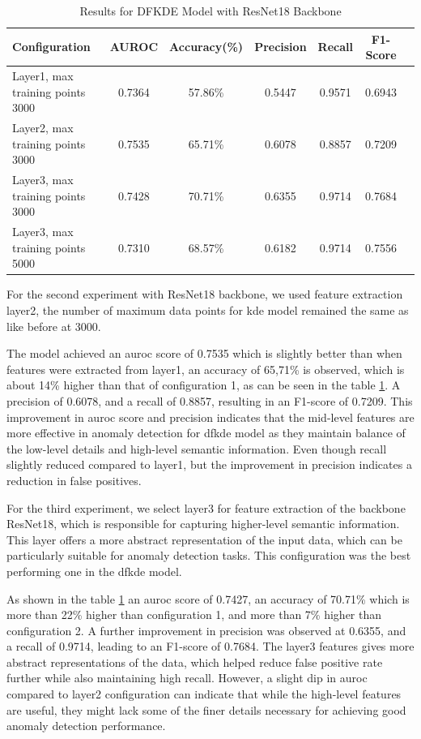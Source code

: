 \begin{table}[ht!]
    \centering
    \begin{tabular}{|l|c|c|c|c|c|c|}
        \hline
        \textbf{Configuration} & \textbf{AUROC} & \textbf{Accuracy(\%)} & \textbf{Precision} & \textbf{Recall} & \textbf{F1-Score} \\ \hline
        Layer1, max training points 3000 & 0.7364 & 57.86\% & 0.5447 & 0.9571 & 0.6943 \\ \hline
        Layer2, max training points 3000 & 0.7535 & 65.71\% & 0.6078 & 0.8857 & 0.7209 \\ \hline
        Layer3, max training points 3000 & 0.7428 & 70.71\% & 0.6355 & 0.9714 & 0.7684 \\ \hline
        Layer3, max training points 5000 & 0.7310 & 68.57\% & 0.6182 & 0.9714 & 0.7556 \\ \hline
    \end{tabular}
    \caption{Results for DFKDE Model with ResNet18 Backbone}
    \label{tab:dfkde resnet18 results}
\end{table}

For the second experiment with ResNet18 backbone, we used feature extraction layer2, the number of maximum data points for \gls{kde} model remained the same as like before at 3000.

The model achieved an \gls{auroc} score of 0.7535 which is slightly better than when features were extracted from layer1, an accuracy of 65,71\% is observed, which is about 14\% higher than that of configuration 1, as can be seen in the table \ref{tab:dfkde resnet18 results}. A precision of 0.6078, and a recall of 0.8857, resulting in an F1-score of 0.7209. This improvement in \gls{auroc} score and precision indicates that the mid-level features are more effective in anomaly detection for \gls{dfkde} model as they maintain balance of the low-level details and high-level semantic information. Even though recall slightly reduced compared to layer1, but the improvement in precision indicates a reduction in false positives.

For the third experiment, we select layer3 for feature extraction of the backbone ResNet18, which is responsible for capturing higher-level semantic information. This layer offers a more abstract representation of the input data, which can be particularly suitable for anomaly detection tasks. This configuration was the best performing one in the \gls{dfkde} model.

As shown in the table \ref{tab:dfkde resnet18 results} an \gls{auroc} score of 0.7427, an accuracy of 70.71\% which is more than 22\% higher than configuration 1, and more than 7\% higher than configuration 2. A further improvement in precision was observed at 0.6355, and a recall of 0.9714, leading to an F1-score of 0.7684. The layer3 features gives more abstract representations of the data, which helped reduce false positive rate further while also maintaining high recall. However, a slight dip in \gls{auroc} compared to layer2 configuration can indicate that while the high-level features are useful, they might lack some of the finer details necessary for achieving good anomaly detection performance.

